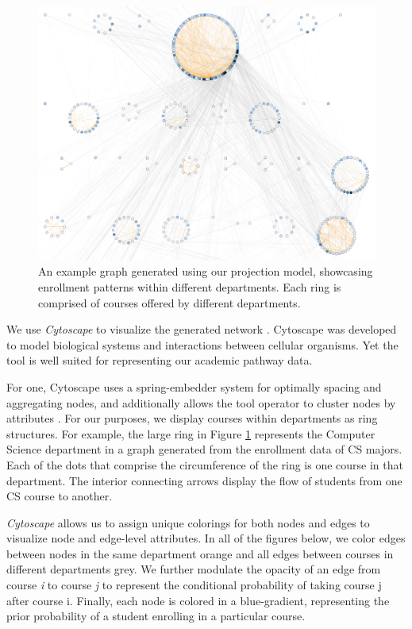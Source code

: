 \documentclass{sigchi}
\begin{document}
\begin{figure}
    \centering
    \includegraphics[width=\columnwidth]{final-overview.pdf}
    \caption{An example graph generated using our projection model,
      showcasing enrollment patterns within different departments. Each ring is comprised of courses offered by different departments.}
    \label{fig:overview}
\end{figure}

We use \textit{Cytoscape} to visualize the generated network
\cite{shannon2003cytoscape}. Cytoscape was developed to model
biological systems and interactions between cellular organisms. Yet
the tool is well suited for representing our academic pathway
data.

For one, Cytoscape uses a spring-embedder system for optimally spacing
and aggregating nodes, and additionally allows the tool operator to
cluster nodes by attributes \cite{Battista1994}. For our purposes, we
display courses within departments as ring structures. For example, the
large ring in Figure \ref{fig:overview} represents the Computer
Science department in a graph generated from the enrollment data of CS majors. Each of the dots that comprise the circumference of the ring
is one course in that department. The interior connecting arrows
display the flow of students from one CS course to another.

{\em Cytoscape} allows us to assign unique colorings for both nodes
and edges to visualize node and edge-level attributes. In all of the
figures below, we color edges between nodes in the same department
orange and all edges between courses in different departments grey. We
further modulate the opacity of an edge from course \textit{i} to
course \textit{j} to represent the conditional probability of
taking course j after course i. Finally, each node is colored in a
blue-gradient, representing the prior probability of a student enrolling in a particular course.
\end{document}
